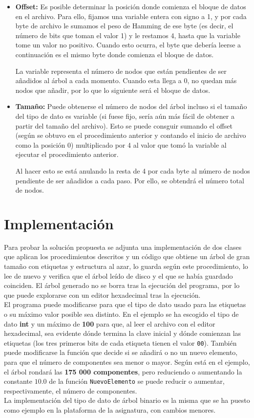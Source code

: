 \documentclass{article}
\begin{document}
\begin{itemize}
	\item \textbf{Offset:} Es posible determinar la posición donde comienza el
	bloque de datos en el archivo. Para ello, fijamos una variable entera con
	signo a 1, y por cada byte de archivo le sumamos el peso de Hamming de ese
	byte (es decir, el número de bits que toman el valor 1) y le restamos 4, hasta
	que la variable tome un valor no positivo. Cuando esto ocurra, el byte que
	debería leerse a continuación es el mismo byte donde comienza el bloque de
	datos.

	La variable representa el número de nodos que están pendientes de ser añadidos
	al árbol a cada momento. Cuando esta llega a 0, no quedan más nodos que añadir,
	por lo que lo siguiente será el bloque de datos.
	\item \textbf{Tamaño:} Puede obtenerse el número de nodos del árbol incluso
	si el tamaño del tipo de dato es variable (si fuese fijo, sería aún más fácil
	de obtener a partir del tamaño del archivo). Esto se puede consguir sumando el
	offset (según se obtuvo en el procedimiento anterior y contando el inicio de
	archivo como la posición 0) multiplicado por 4 al valor que tomó la variable al
	ejecutar el procedimiento anterior.

	Al hacer esto se está anulando la resta de 4 por cada byte al número de nodos
	pendiente de ser añadidos a cada paso. Por ello, se obtendrá el número total
	de nodos.
\end{itemize}

\section{Implementación}

Para probar la solución propuesta se adjunta una implementación de dos clases que
aplican los procedimientos descritos y un código que obtiene un árbol de gran
tamaño con etiquetas y estructura al azar, lo guarda según este procedimiento, lo
lee de nuevo y verifica que el árbol leído de disco y el que se había guardado
coinciden. El árbol generado no se borra tras la ejecución del programa, por lo
que puede explorarse con un editor hexadecimal tras la ejecución. \\

El programa puede modificarse para que el tipo de dato usado para las etiquetas o
su máximo valor posible sea distinto. En el ejemplo se ha escogido el tipo de dato
\textbf{int} y un máximo de \textbf{100} para que, al leer el archivo con el editor
hexadecimal, sea evidente dónde termina la clave inicial y dónde comienzan las
etiquetas (los tres primeros bits de cada etiqueta tienen el valor \texttt{00}).
También puede modificarse la función que decide si se añadirá o no un nuevo
elemento, para que el número de componentes sea menor o mayor. Según está en el
ejemplo, el árbol rondará las \textbf{175 000 componentes}, pero reduciendo o
aumentando la constante $10.0$ de la función \texttt{NuevoElemento} se puede
reducir o aumentar, respectivamente, el número de componentes. \\

La implementación del tipo de dato de árbol binario es la misma que se ha puesto
como ejemplo en la plataforma de la asignatura, con cambios menores.
\end{document}
